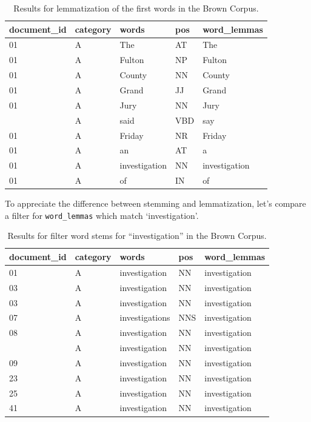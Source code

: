 \documentclass[
  letterpaper,
]{latex/krantz}
\begin{document}
\hypertarget{tbl-recoding-lemmatization-brown-example}{}
\begin{table}
\caption{\label{tbl-recoding-lemmatization-brown-example}Results for lemmatization of the first words in the Brown Corpus. }\tabularnewline

\centering
\begin{tabular}{lllll}
\toprule
document\_id & category & words & pos & word\_lemmas\\
\midrule
01 & A & The & AT & The\\
01 & A & Fulton & NP & Fulton\\
01 & A & County & NN & County\\
01 & A & Grand & JJ & Grand\\
01 & A & Jury & NN & Jury\\
\addlinespace
01 & A & said & VBD & say\\
01 & A & Friday & NR & Friday\\
01 & A & an & AT & a\\
01 & A & investigation & NN & investigation\\
01 & A & of & IN & of\\
\bottomrule
\end{tabular}
\end{table}

To appreciate the difference between stemming and lemmatization, let's
compare a filter for \texttt{word\_lemmas} which match `investigation'.

\hypertarget{tbl-recoding-lemmatization-brown-investigation}{}
\begin{table}
\caption{\label{tbl-recoding-lemmatization-brown-investigation}Results for filter word stems for ``investigation'' in the Brown Corpus. }\tabularnewline

\centering
\begin{tabular}{lllll}
\toprule
document\_id & category & words & pos & word\_lemmas\\
\midrule
01 & A & investigation & NN & investigation\\
03 & A & investigation & NN & investigation\\
03 & A & investigation & NN & investigation\\
07 & A & investigations & NNS & investigation\\
08 & A & investigation & NN & investigation\\
\addlinespace
09 & A & investigation & NN & investigation\\
09 & A & investigation & NN & investigation\\
23 & A & investigation & NN & investigation\\
25 & A & investigation & NN & investigation\\
41 & A & investigation & NN & investigation\\
\bottomrule
\end{tabular}
\end{table}
\end{document}
